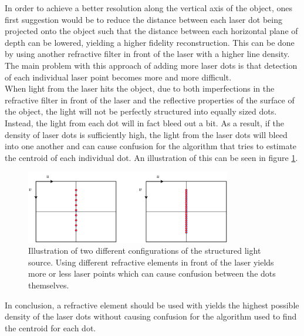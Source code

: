 In order to achieve a better resolution along the vertical axis of the object, ones first suggestion would be to reduce the distance between each laser dot being projected onto the object such that the distance between each horizontal plane of depth can be lowered, yielding a higher fidelity reconstruction. This can be done by using another refractive filter in front of the laser with a higher line density. The main problem with this approach of adding more laser dots is that detection of each individual laser point becomes more and more difficult.\\

When light from the laser hits the object, due to both imperfections in the refractive filter in front of the laser and the reflective properties of the surface of the object, the light will not be perfectly structured into equally sized dots. Instead, the light from each dot will in fact bleed out a bit. As a result, if the density of laser dots is sufficiently high, the light from the laser dots will bleed into one another and can cause confusion for the algorithm that tries to estimate the centroid of each individual dot. An illustration of this can be seen in figure \ref{fig:dotdensity}.     

\begin{figure}[h]
    \centering
    \includegraphics[width=0.8\textwidth]{figures/reconstruction/dotdensity.pdf}
    \caption{Illustration of two different configurations of the structured light source. Using different refractive elements in front of the laser yields more or less laser points which can cause confusion between the dots themselves.}
    \label{fig:dotdensity}
\end{figure}

In conclusion, a refractive element should be used with yields the highest possible density of the laser dots without causing confusion for the algorithm used to find the centroid for each dot. 

\newpage 
 
